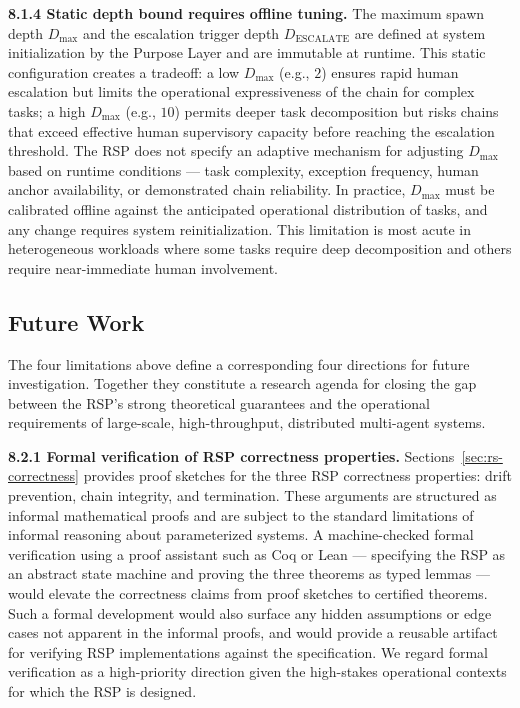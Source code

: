 \medskip
\noindent\textbf{8.1.4  Static depth bound requires offline tuning.}
The maximum spawn depth $D_{\max}$ and the escalation trigger depth $D_{\mathrm{ESCALATE}}$ are defined at system initialization by the Purpose Layer and are immutable at runtime. This static configuration creates a tradeoff: a low $D_{\max}$ (e.g., $2$) ensures rapid human escalation but limits the operational expressiveness of the chain for complex tasks; a high $D_{\max}$ (e.g., $10$) permits deeper task decomposition but risks chains that exceed effective human supervisory capacity before reaching the escalation threshold. The RSP does not specify an adaptive mechanism for adjusting $D_{\max}$ based on runtime conditions — task complexity, exception frequency, human anchor availability, or demonstrated chain reliability. In practice, $D_{\max}$ must be calibrated offline against the anticipated operational distribution of tasks, and any change requires system reinitialization. This limitation is most acute in heterogeneous workloads where some tasks require deep decomposition and others require near-immediate human involvement.

\subsection{Future Work}
\label{sec:rs-future-work}

The four limitations above define a corresponding four directions for future investigation. Together they constitute a research agenda for closing the gap between the RSP's strong theoretical guarantees and the operational requirements of large-scale, high-throughput, distributed multi-agent systems.

\medskip
\noindent\textbf{8.2.1  Formal verification of RSP correctness properties.}
Sections~\ref{sec:rs-correctness} provides proof sketches for the three RSP correctness properties: drift prevention, chain integrity, and termination. These arguments are structured as informal mathematical proofs and are subject to the standard limitations of informal reasoning about parameterized systems. A machine-checked formal verification using a proof assistant such as Coq or Lean — specifying the RSP as an abstract state machine and proving the three theorems as typed lemmas — would elevate the correctness claims from proof sketches to certified theorems. Such a formal development would also surface any hidden assumptions or edge cases not apparent in the informal proofs, and would provide a reusable artifact for verifying RSP implementations against the specification. We regard formal verification as a high-priority direction given the high-stakes operational contexts for which the RSP is designed.

